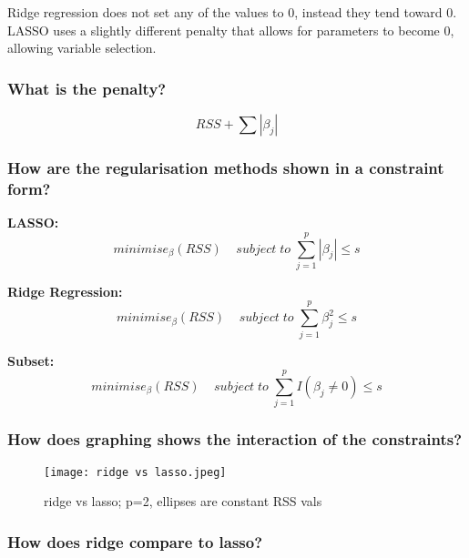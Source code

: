 \documentclass[11pt]{scrartcl} %
\begin{document}
Ridge regression does not set any of the values to 0, instead they tend toward 0. LASSO uses
a slightly different penalty that allows for parameters to become 0, allowing variable selection.

\subsubsection{What is the penalty?}

\begin{equation}
	RSS + \sum{|\beta_j|}
\end{equation}

\subsubsection{How are the regularisation methods shown in a constraint form?}

\textbf{LASSO:}
\begin{equation}
	minimise_{\beta}(RSS)\;\;\;\; subject\; to\; \sum^p_{j=1}{|\beta_j|} \leq s
\end{equation}

\textbf{Ridge Regression:}
\begin{equation}
	minimise_{\beta}(RSS)\;\;\;\; subject\; to\; \sum^p_{j=1}{\beta_j^2} \leq s
\end{equation}

\textbf{Subset:}
\begin{equation}
	minimise_{\beta}(RSS)\;\;\;\; subject\; to\; \sum^p_{j=1}{I(\beta_j\neq 0)} \leq s
\end{equation}

\subsubsection{How does graphing shows the interaction of the constraints?}

\begin{figure}[h] %
	\centering
	\texttt{[image: ridge vs lasso.jpeg]} %
	\caption{ridge vs lasso; p=2, ellipses are constant RSS vals}
\end{figure}

\subsubsection{How does ridge compare to lasso?}
\end{document}
